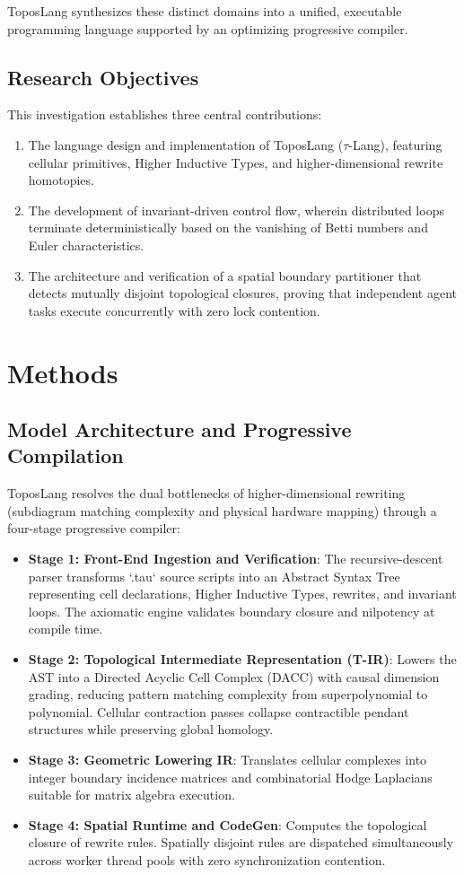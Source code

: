 \documentclass[10pt,a4paper]{article}
\begin{document}
ToposLang synthesizes these distinct domains into a unified, executable programming language supported by an optimizing progressive compiler.

\subsection{Research Objectives}
This investigation establishes three central contributions:
\begin{enumerate}
    \item The language design and implementation of ToposLang ($\tau$-Lang), featuring cellular primitives, Higher Inductive Types, and higher-dimensional rewrite homotopies.
    \item The development of invariant-driven control flow, wherein distributed loops terminate deterministically based on the vanishing of Betti numbers and Euler characteristics.
    \item The architecture and verification of a spatial boundary partitioner that detects mutually disjoint topological closures, proving that independent agent tasks execute concurrently with zero lock contention.
\end{enumerate}

\section{Methods}

\subsection{Model Architecture and Progressive Compilation}
ToposLang resolves the dual bottlenecks of higher-dimensional rewriting (subdiagram matching complexity and physical hardware mapping) through a four-stage progressive compiler:
\begin{itemize}
    \item \textbf{Stage 1: Front-End Ingestion and Verification}: The recursive-descent parser transforms `.tau` source scripts into an Abstract Syntax Tree representing cell declarations, Higher Inductive Types, rewrites, and invariant loops. The axiomatic engine validates boundary closure and nilpotency at compile time.
    \item \textbf{Stage 2: Topological Intermediate Representation (T-IR)}: Lowers the AST into a Directed Acyclic Cell Complex (DACC) with causal dimension grading, reducing pattern matching complexity from superpolynomial to polynomial. Cellular contraction passes collapse contractible pendant structures while preserving global homology.
    \item \textbf{Stage 3: Geometric Lowering IR}: Translates cellular complexes into integer boundary incidence matrices and combinatorial Hodge Laplacians suitable for matrix algebra execution.
    \item \textbf{Stage 4: Spatial Runtime and CodeGen}: Computes the topological closure of rewrite rules. Spatially disjoint rules are dispatched simultaneously across worker thread pools with zero synchronization contention.
\end{itemize}
\end{document}
